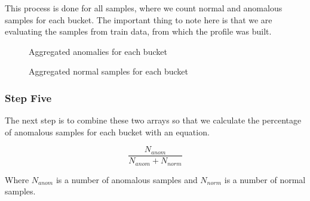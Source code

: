     

This process is done for all samples, where we count normal and anomalous samples for each bucket.
The important thing to note here is that we are evaluating the samples from train data, from which the profile was built.

\begin{figure}[H]
    \centering
    \caption{Aggregated anomalies for each bucket}
    \label{arr:agg_anom}
\end{figure}

\begin{figure}[H]
    \centering
    \caption{Aggregated normal samples for each bucket}
    \label{arr:agg_norm}
\end{figure}

\subsubsection{Step Five}

The next step is to combine these two arrays so that we calculate the percentage of anomalous samples 
for each bucket with an equation. 

\begin{equation}
    \frac{N_{anom}}{N_{anom}+N_{norm}}
    \label{eq:ratio}
\end{equation}

Where $N_{anom}$ is a number of anomalous samples and $N_{norm}$ is a number of normal samples.


